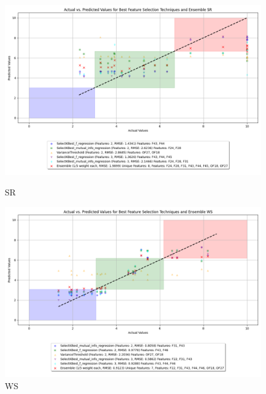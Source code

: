 \begin{figure}[H]
    \centering
    \begin{minipage}{0.45\textwidth}
        \centering
        \includegraphics[width=\linewidth]{reg_section_all/images_reg_featred_ensemble/actual_vs_predicted_smallest_feature_selection_and_ensemble_SR.png}
        \caption{SR}
        \label{fig:sr_reg_featred_smallest_ensemble}
    \end{minipage}\hfill
    \begin{minipage}{0.45\textwidth}
        \centering
        \includegraphics[width=\linewidth]{reg_section_all/images_reg_featred_ensemble/actual_vs_predicted_smallest_feature_selection_and_ensemble_WS.png}
        \caption{WS}
        \label{fig:ws_reg_featred_smallest_ensemble}
    \end{minipage}
\end{figure}

